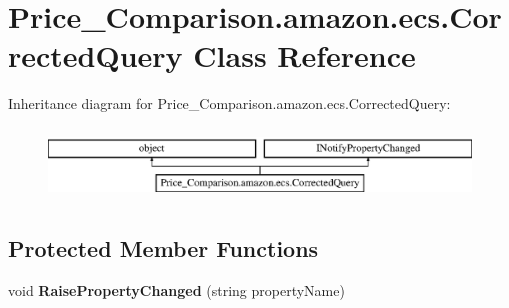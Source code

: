 \hypertarget{class_price___comparison_1_1amazon_1_1ecs_1_1_corrected_query}{\section{Price\-\_\-\-Comparison.\-amazon.\-ecs.\-Corrected\-Query Class Reference}
\label{class_price___comparison_1_1amazon_1_1ecs_1_1_corrected_query}
}


 


Inheritance diagram for Price\-\_\-\-Comparison.\-amazon.\-ecs.\-Corrected\-Query\-:\begin{figure}[H]
\begin{center}
\leavevmode
\includegraphics[height=1.917808cm]{class_price___comparison_1_1amazon_1_1ecs_1_1_corrected_query}
\end{center}
\end{figure}
\subsection*{Protected Member Functions}
\begin{DoxyCompactItemize}
\item 
\hypertarget{class_price___comparison_1_1amazon_1_1ecs_1_1_corrected_query_af793d3a0aadd1a20eadf946773ab8c05}{void {\bfseries Raise\-Property\-Changed} (string property\-Name)}\label{class_price___comparison_1_1amazon_1_1ecs_1_1_corrected_query_af793d3a0aadd1a20eadf946773ab8c05}

\end{DoxyCompactItemize}
